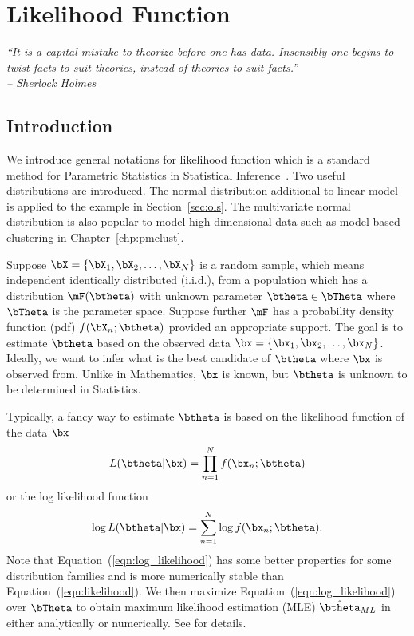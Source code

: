 
\chapter{Likelihood Function}
\label{chp:mle}


{\it
``It is a capital mistake to theorize before one has data.
Insensibly one begins to twist facts to suit theories,
instead of theories to suit facts.'' \\
\--- Sherlock Holmes
}


\section{Introduction}

We introduce general notations for likelihood function
which is a standard method for Parametric Statistics in
Statistical Inference~\citep{Casella2001}.
Two useful distributions are introduced.
The normal distribution additional to linear model is applied to
the example in Section~\ref{sec:ols}.
The multivariate normal
distribution
is also popular to model high dimensional data such as
model-based clustering in Chapter~\ref{chp:pmclust}.

Suppose $\bX = \{\bX_1, \bX_2, \ldots, \bX_N\}$ is a random sample,
which means independent identically distributed
(i.i.d.),
from a population which has a distribution $\mF(\btheta)$ with unknown
parameter $\btheta \in \bTheta$ where $\bTheta$ is the parameter space.
Suppose further $\mF$ has a probability density function
(pdf)
$f(\bX_n; \btheta)$ provided an appropriate support.
The goal is to estimate $\btheta$ based on the observed data
$\bx = \{\bx_1, \bx_2, \ldots, \bx_N\}$.
Ideally, we want to infer what is the best candidate of $\btheta$
where $\bx$ is observed from.
Unlike in Mathematics, $\bx$ is known, but $\btheta$ is unknown
to be determined in Statistics.

Typically, a fancy way to estimate $\btheta$ is based on the
likelihood function of the data $\bx$
\begin{equation}
L(\btheta|\bx) = \prod_{n = 1}^N f(\bx_n; \btheta)
\label{eqn:likelihood}
\end{equation}
or the log likelihood function
\begin{equation}
\log L(\btheta|\bx) = \sum_{n = 1}^N \log f(\bx_n; \btheta).
\label{eqn:log_likelihood}
\end{equation}
Note that Equation~(\ref{eqn:log_likelihood}) has some
better properties for some distribution families and
is more numerically stable than Equation~(\ref{eqn:likelihood}).
We then maximize Equation~(\ref{eqn:log_likelihood})
over $\bTheta$ to obtain maximum likelihood estimation
(MLE) $\hat{\btheta}_{ML}$ in either analytically or numerically.
See \citet{Casella2001} for details.





